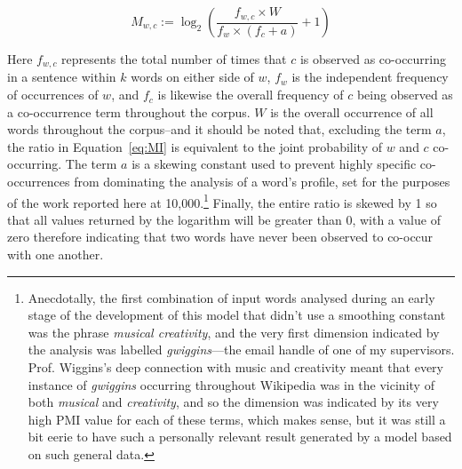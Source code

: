 \begin{equation}\label{eq:MI}
M_{w,c} := \log_2 \left(\frac{f_{w,c} \times W}{f_w \times \left(f_c + a\right)} + 1\right)
\end{equation}

Here $f_{w,c}$ represents the total number of times that $c$ is observed as co-occurring in a sentence within $k$ words on either side of $w$, $f_w$ is the independent frequency of occurrences of $w$, and $f_c$ is likewise the overall frequency of $c$ being observed as a co-occurrence term throughout the corpus.  $W$ is the overall occurrence of all words throughout the corpus--and it should be noted that, excluding the term $a$, the ratio in Equation~\ref{eq:MI} is equivalent to the joint probability of $w$ and $c$ co-occurring.  The term $a$ is a skewing constant used to prevent highly specific co-occurrences from dominating the analysis of a word's profile, set for the purposes of the work reported here at 10,000.\footnote{Anecdotally, the first combination of input words analysed during an early stage of the development of this model that didn't use a smoothing constant was the phrase \emph{musical creativity}, and the very first dimension indicated by the analysis was labelled \emph{gwiggins}---the email handle of one of my supervisors.  Prof. Wiggins's deep connection with music and creativity meant that every instance of \emph{gwiggins} occurring throughout Wikipedia was in the vicinity of both \emph{musical} and \emph{creativity}, and so the dimension was indicated by its very high PMI value for each of these terms, which makes sense, but it was still a bit eerie to have such a personally relevant result generated by a model based on such general data.}  Finally, the entire ratio is skewed by 1 so that all values returned by the logarithm will be greater than 0, with a value of zero therefore indicating that two words have never been observed to co-occur with one another.

